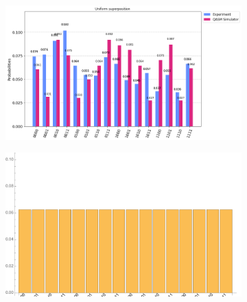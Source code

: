 \documentclass[10pt]{amsart}
\theoremstyle{definition}
\begin{document}
\begin{figure}[hbt]
    \begin{subfigure}{0.4\textwidth}
    \centering
    \includegraphics[width=0.9\linewidth]{inputUnif_quantum.png}
  \end{subfigure}
  \begin{subfigure}{0.4\textwidth}
    \centering
    \includegraphics[width=0.9\linewidth]{inputUnif_exact.pdf}
  \end{subfigure}
  

\end{figure}
\end{document}
